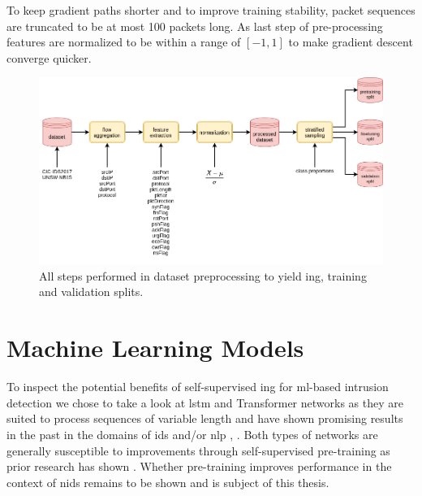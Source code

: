 To keep gradient paths shorter and to improve training stability, packet sequences are truncated to be at most 100 packets long. As last step of pre-processing features are normalized to be within a range of $[-1,1]$ to make gradient descent converge quicker.

\begin{figure}[h]
	\centering
	\includegraphics[width=0.95\linewidth]{graphics/img/dataset_preprocessing.png}
	\caption{All steps performed in dataset preprocessing to yield ing, training and validation splits.}
	\label{fig:dataset_preprocessing}
\end{figure}

\section{Machine Learning Models}

To inspect the potential benefits of self-supervised ing for \gls{ml}-based intrusion detection we chose to take a look at \gls{lstm} and Transformer networks as they are suited to process sequences of variable length and have shown promising results in the past in the domains of \gls{ids} and/or \gls{nlp} \cite{bert}, \cite{attention_model_ids}. Both types of networks are generally susceptible to improvements through self-supervised pre-training as prior research has shown \cite{bert} \cite{unsupervised_learning_lstms} \cite{unsupervised_learning_lstms_timeseries}. Whether pre-training improves performance in the context of \gls{nids} remains to be shown and is subject of this thesis.

